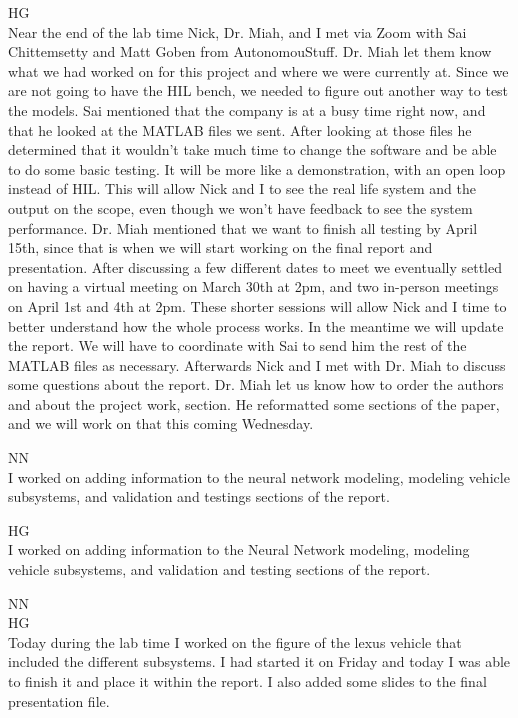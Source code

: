 \documentclass[fontsize=11pt, %
                             paper=letter, %
                             openany, %
                             captions=tableheading,
                             index=totoc,
                             hyperref]{labbook}
\def\currentYear{2021}
\begin{document}
\begin{addmargin}[0cm]{0cm}
HG\\ Near the end of the lab time Nick, Dr. Miah, and I met via Zoom with Sai Chittemsetty and Matt Goben from AutonomouStuff. Dr. Miah let them know what we had worked on for this project and where we were currently at. Since we are not going to have the HIL bench, we needed to figure out another way to test the models. Sai mentioned that the company is at a busy time right now, and that he looked at the MATLAB files we sent. After looking at those files he determined that it wouldn't take much time to change the software and be able to do some basic testing. It will be more like a demonstration, with an open loop instead of HIL. This will allow Nick and I to see the real life system and the output on the scope, even though we won't have feedback to see the system performance. Dr. Miah mentioned that we want to finish all testing by April 15th, since that is when we will start working on the final report and presentation. After discussing a few different dates to meet we eventually settled on having a virtual meeting on March 30th at 2pm, and two in-person meetings on April 1st and 4th at 2pm. These shorter sessions will allow Nick and I time to better understand how the whole process works. In the meantime we will update the report. We will have to coordinate with Sai to send him the rest of the MATLAB files as necessary. 
\linebreak
Afterwards Nick and I met with Dr. Miah to discuss some questions about the report. Dr. Miah let us know how to order the authors and about the project work,  section. He reformatted some sections of the paper, and we will work on that this coming Wednesday. 

\labday{Wednesday, March 23, \currentYear}
NN\\
I worked on adding information to the neural network modeling, modeling vehicle subsystems, and validation and testings sections of the report.

HG\\
I worked on adding information to the Neural Network modeling, modeling vehicle subsystems, and validation and testing sections of the report. 

\labday{Monday, March 28, \currentYear}
NN\\


HG\\
Today during the lab time I worked on the figure of the lexus vehicle that included the different subsystems. I had started it on Friday and today I was able to finish it and place it within the report. I also added some slides to the final presentation file. 
\linebreak


\end{addmargin}
\end{document}
